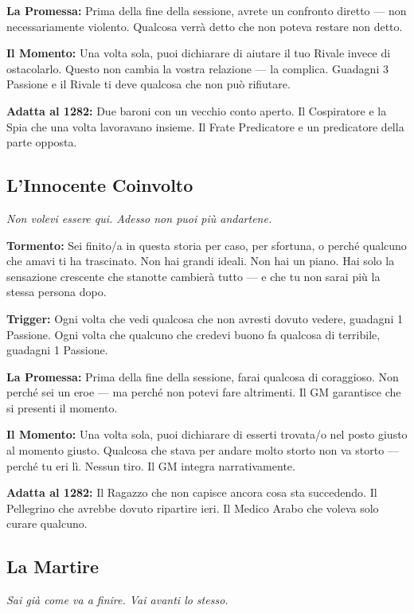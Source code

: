 \textbf{La Promessa:} Prima della fine della sessione, avrete un
confronto diretto — non necessariamente violento. Qualcosa verrà
detto che non poteva restare non detto.

\textbf{Il Momento:} Una volta sola, puoi dichiarare di aiutare
il tuo Rivale invece di ostacolarlo. Questo non cambia la vostra
relazione — la complica. Guadagni 3 Passione e il Rivale ti deve
qualcosa che non può rifiutare.

\textbf{Adatta al 1282:} Due baroni con un vecchio conto aperto.
Il Cospiratore e la Spia che una volta lavoravano insieme. Il Frate
Predicatore e un predicatore della parte opposta.

\filetto

\subsection{L'Innocente Coinvolto}
\textit{Non volevi essere qui. Adesso non puoi più andartene.}

\textbf{Tormento:} Sei finito/a in questa storia per caso, per
sfortuna, o perché qualcuno che amavi ti ha trascinato. Non hai
grandi ideali. Non hai un piano. Hai solo la sensazione crescente
che stanotte cambierà tutto — e che tu non sarai più la stessa
persona dopo.

\textbf{Trigger:} Ogni volta che vedi qualcosa che non avresti
dovuto vedere, guadagni 1 Passione. Ogni volta che qualcuno che
credevi buono fa qualcosa di terribile, guadagni 1 Passione.

\textbf{La Promessa:} Prima della fine della sessione, farai
qualcosa di coraggioso. Non perché sei un eroe — ma perché non
potevi fare altrimenti. Il GM garantisce che si presenti il momento.

\textbf{Il Momento:} Una volta sola, puoi dichiarare di esserti
trovata/o nel posto giusto al momento giusto. Qualcosa che stava
per andare molto storto non va storto — perché tu eri lì. Nessun
tiro. Il GM integra narrativamente.

\textbf{Adatta al 1282:} Il Ragazzo che non capisce ancora cosa
sta succedendo. Il Pellegrino che avrebbe dovuto ripartire ieri.
Il Medico Arabo che voleva solo curare qualcuno.

\filetto

\subsection{La Martire}
\textit{Sai già come va a finire. Vai avanti lo stesso.}

